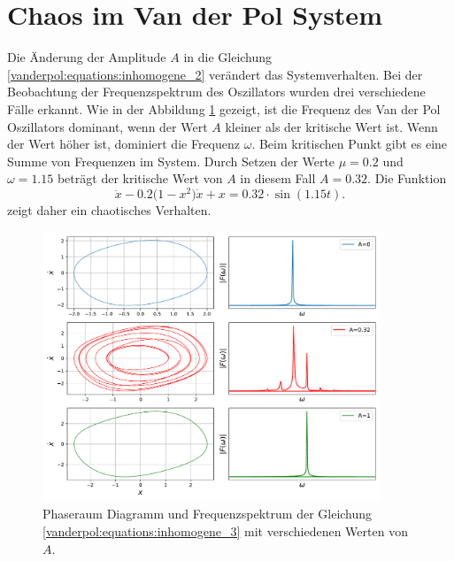 \section{Chaos im Van der Pol System\label{vanderpol:section:chaos}}
%

Die Änderung der Amplitude $A$ in die Gleichung \eqref{vanderpol:equations:inhomogene_2} verändert das Systemverhalten. Bei der Beobachtung der Frequenzspektrum des Oszillators wurden drei verschiedene Fälle erkannt. Wie in der Abbildung \ref{vanderpol:figures:fft} gezeigt, ist die Frequenz des Van der Pol Oszillators dominant, wenn der Wert $A$ kleiner als der kritische Wert ist. Wenn der Wert höher ist, dominiert die Frequenz $\omega$.
Beim kritischen Punkt gibt es eine Summe von Frequenzen im System.
Durch Setzen der Werte $\mu=0.2$ und $\omega=1.15$ beträgt der kritische Wert von $A$ in diesem Fall $A=0.32$. Die Funktion 
\begin{equation}
	\ddot{x}-0.2\bigl(1-x^{2}\bigr) \dot{x}+x = 0.32 \cdot \sin(1.15 t).
	\label{vanderpol:equations:inhomogene_3}
\end{equation}
zeigt daher ein chaotisches Verhalten.
\begin{figure}
	\centering
	\includegraphics[width=0.9\textwidth]{papers/vanderpol/figures/fft_plot2.pdf}
	\caption{Phaseraum Diagramm und Frequenzspektrum der Gleichung \eqref{vanderpol:equations:inhomogene_3} mit verschiedenen Werten von $A$.\label{vanderpol:figures:fft}}
\end{figure}

